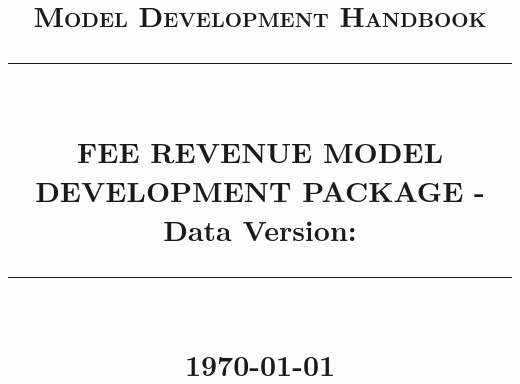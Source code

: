 \newcommand\SeasonTime{0,1,2,3}
\newcommand\DiagnosticTest{1,2,3,4,5,6,7,8,9,10}
\newcommand\ArimaxNum{1,...,100}
\newcommand\MaxTestModels{20}

\def\imagetop#1{\vtop{\null\hbox{#1}}} %
\usepackage{tikz}%
\newcommand\pagetitlecenter[1] {{\Large{\textbf{#1}}}}

\usepackage{fancyhdr}
 {
  \fancyhf{}%
  \fancyheadoffset{0cm}  
  \fancyfoot[C]{-\thepage-}%
  \renewcommand{\headrulewidth}{1pt}%
  \renewcommand{\headrule}{\hbox to\headwidth{%
    \color{color_gold}\leaders\hrule height \headrulewidth\hfill}}
  \renewcommand{\footrulewidth}{0pt}%
}
\pagestyle{myheader}

\def\imagetop#1{\vtop{\null\hbox{#1}}} %
\usepackage{afterpage}

\newcommand{\HRule}[1]{\rule{\linewidth}{#1}} 	%

\makeatletter							%
\def\printtitle{%
    {\centering \@title\par}}
\makeatother

\makeatletter							%
\def\printauthor{%
    {\centering \large \@author}}
\makeatother

\title{	\normalsize \textsc{Model Development Handbook}%
		 	\\[2.0cm]													%
			\HRule{0.5pt} \\										%
			\LARGE \textbf{\uppercase{Fee Revenue Model Development Package} - \BU\\
			\large Data Version: \version}
			\HRule{2pt} \\ [0.5cm]								%
			\normalsize \today									%
		}

